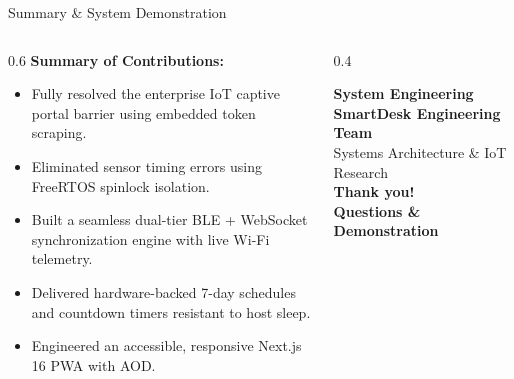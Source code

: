 \documentclass[aspectratio=169, 10pt]{beamer}
\begin{document}
\begin{frame}{Summary \& System Demonstration}
    \begin{columns}[T]
        \begin{column}{0.6\textwidth}
            \textbf{Summary of Contributions:}
            \begin{itemize}
                \item Fully resolved the enterprise IoT captive portal barrier using embedded token scraping.
                \item Eliminated sensor timing errors using FreeRTOS spinlock isolation.
                \item Built a seamless dual-tier BLE + WebSocket synchronization engine with live Wi-Fi telemetry.
                \item Delivered hardware-backed 7-day schedules and countdown timers resistant to host sleep.
                \item Engineered an accessible, responsive Next.js 16 PWA with AOD.
            \end{itemize}
        \end{column}
        
        \begin{column}{0.4\textwidth}
            \begin{block}{\textbf{System Engineering}}
                \centering
                \textbf{\large SmartDesk Engineering Team}\\
                \vspace{0.1cm}
                \footnotesize Systems Architecture \& IoT Research\\
                \vspace{0.2cm}
                \color{primaryBlue} \textbf{Thank you!}\\
                \textbf{Questions \& Demonstration}
            \end{block}
        \end{column}
    \end{columns}
\end{frame}
\end{document}

